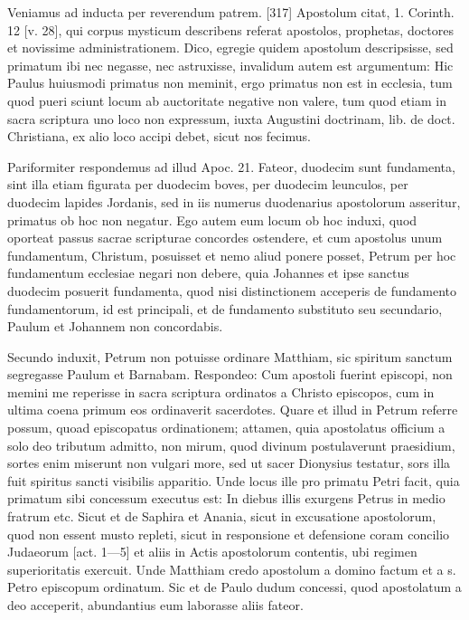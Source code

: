 Veniamus ad inducta per reverendum patrem. [317] Apostolum citat, 1. Corinth. 12 [v. 28], qui corpus mysticum describens referat apostolos, prophetas, doctores et novissime administrationem. Dico, egregie quidem apostolum descripsisse, sed primatum ibi nec negasse, nec astruxisse, invalidum autem est argumentum: Hic Paulus huiusmodi primatus non meminit, ergo primatus non est in ecclesia, tum quod pueri sciunt locum ab auctoritate negative non valere, tum quod etiam in sacra scriptura uno loco non expressum, iuxta Augustini doctrinam, lib. de doct. Christiana, ex alio loco accipi debet, sicut nos fecimus.

Pariformiter respondemus ad illud Apoc. 21. Fateor, duodecim sunt fundamenta, sint illa etiam figurata per duodecim boves, per duodecim leunculos, per duodecim lapides Jordanis, sed in iis numerus duodenarius apostolorum asseritur, primatus ob hoc non negatur. Ego autem eum locum ob hoc induxi, quod oporteat passus sacrae scripturae concordes ostendere, et cum apostolus unum fundamentum, Christum, posuisset et nemo aliud ponere posset, Petrum per hoc fundamentum ecclesiae negari non debere, quia Johannes et ipse sanctus duodecim posuerit fundamenta, quod nisi distinctionem acceperis de fundamento fundamentorum, id est principali, et de fundamento substituto seu secundario, Paulum et Johannem non concordabis.

Secundo induxit, Petrum non potuisse ordinare Matthiam, sic spiritum sanctum segregasse Paulum et Barnabam. Respondeo: Cum apostoli fuerint episcopi, non memini me reperisse in sacra scriptura ordinatos a Christo episcopos, cum in ultima coena primum eos ordinaverit sacerdotes. Quare et illud in Petrum referre possum, quoad episcopatus ordinationem; attamen, quia apostolatus officium a solo deo tributum admitto, non mirum, quod divinum postulaverunt praesidium, sortes enim miserunt non vulgari more, sed ut sacer Dionysius testatur, sors illa fuit spiritus sancti visibilis apparitio. Unde locus ille pro primatu Petri facit, quia primatum sibi concessum executus est: In diebus illis exurgens Petrus in medio fratrum etc. Sicut et de Saphira et Anania, sicut in excusatione apostolorum, quod non essent musto repleti, sicut in responsione et defensione coram concilio Judaeorum [act. 1—5] et aliis in Actis apostolorum contentis, ubi regimen superioritatis exercuit. Unde Matthiam credo apostolum a domino factum et a s. Petro episcopum ordinatum. Sic et de Paulo dudum concessi, quod apostolatum a deo acceperit, abundantius eum laborasse aliis fateor.

